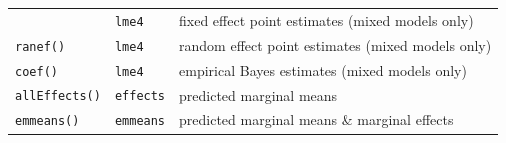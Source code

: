 \documentclass[]{book}
\begin{document}
\begin{longtable}[]{@{}lll@{}}
\begin{minipage}[t]{0.16\columnwidth}
\end{minipage} & \begin{minipage}[t]{0.17\columnwidth}\raggedright\strut
\texttt{lme4}\strut
\end{minipage} & \begin{minipage}[t]{0.58\columnwidth}\raggedright\strut
fixed effect point estimates (mixed models only)\strut
\end{minipage}\tabularnewline
\begin{minipage}[t]{0.16\columnwidth}\raggedright\strut
\texttt{ranef()}\strut
\end{minipage} & \begin{minipage}[t]{0.17\columnwidth}\raggedright\strut
\texttt{lme4}\strut
\end{minipage} & \begin{minipage}[t]{0.58\columnwidth}\raggedright\strut
random effect point estimates (mixed models only)\strut
\end{minipage}\tabularnewline
\begin{minipage}[t]{0.16\columnwidth}\raggedright\strut
\texttt{coef()}\strut
\end{minipage} & \begin{minipage}[t]{0.17\columnwidth}\raggedright\strut
\texttt{lme4}\strut
\end{minipage} & \begin{minipage}[t]{0.58\columnwidth}\raggedright\strut
empirical Bayes estimates (mixed models only)\strut
\end{minipage}\tabularnewline
\begin{minipage}[t]{0.16\columnwidth}\raggedright\strut
\texttt{allEffects()}\strut
\end{minipage} & \begin{minipage}[t]{0.17\columnwidth}\raggedright\strut
\texttt{effects}\strut
\end{minipage} & \begin{minipage}[t]{0.58\columnwidth}\raggedright\strut
predicted marginal means\strut
\end{minipage}\tabularnewline
\begin{minipage}[t]{0.16\columnwidth}\raggedright\strut
\texttt{emmeans()}\strut
\end{minipage} & \begin{minipage}[t]{0.17\columnwidth}\raggedright\strut
\texttt{emmeans}\strut
\end{minipage} & \begin{minipage}[t]{0.58\columnwidth}\raggedright\strut
predicted marginal means \& marginal effects\strut

\end{minipage}
\end{longtable}
\end{document}
